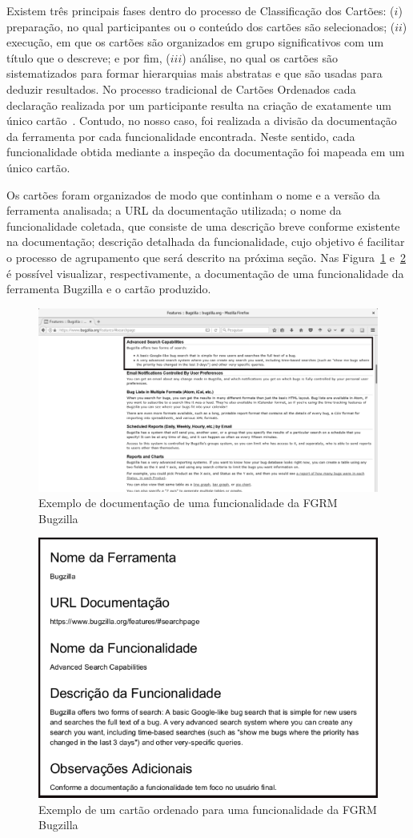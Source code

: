 Existem três principais fases dentro do processo de Classificação dos Cartões:
($i$) preparação, no qual participantes ou o conteúdo dos cartões são
selecionados; ($ii$) execução, em que os cartões são organizados em grupo
significativos com um título que o descreve; e por fim, ($iii$) análise, no qual
os cartões são sistematizados para formar hierarquias mais abstratas e que são
usadas para deduzir resultados. No processo tradicional de Cartões Ordenados
cada declaração realizada por um participante resulta na criação de exatamente
um único cartão~\cite{just2008towards}. Contudo, no nosso caso, foi realizada a
divisão da documentação da ferramenta por cada funcionalidade encontrada. Neste
sentido, cada funcionalidade obtida mediante a inspeção da documentação foi
mapeada em um único cartão.

Os cartões foram organizados de modo que continham o nome e a versão da
ferramenta analisada; a URL da documentação utilizada; o nome da funcionalidade
coletada, que consiste de uma descrição breve conforme existente na
documentação; descrição detalhada da funcionalidade, cujo objetivo é facilitar o
processo de agrupamento que será descrito na próxima seção. Nas
Figura~\ref{fig:documentacao_bugzilla} e~\ref{fig:exemplo_cartao_ordenado} é
possível visualizar, respectivamente, a documentação de uma funcionalidade da
ferramenta Bugzilla e o cartão produzido.

\begin{figure}[htpb]
	\centering
	\includegraphics[width=0.9\linewidth]{./chapter-estudo-funcionalidades-fgrm/img/documentacao_bugzilla.png}
	\caption{Exemplo de documentação de uma funcionalidade da FGRM Bugzilla}
\label{fig:documentacao_bugzilla}
\end{figure}

\begin{figure}[htpb]
	\centering
	\includegraphics[width=0.5\linewidth]{./chapter-estudo-funcionalidades-fgrm/img/exemplo_cartao_ordenado.png}
	\caption{Exemplo de um cartão ordenado para uma funcionalidade da FGRM
		Bugzilla}
\label{fig:exemplo_cartao_ordenado}
\end{figure}

